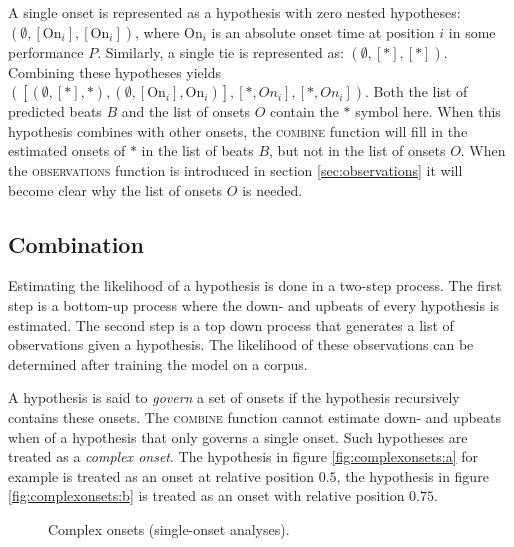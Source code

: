 A single onset is represented as a hypothesis with zero nested hypotheses: $(\emptyset, [\textrm{On}_i], [\textrm{On}_i])$, where $\textrm{On}_i$ is an absolute onset time at position $i$ in some performance $P$. Similarly, a single tie is represented as: $(\emptyset, [*], [*])$. Combining these hypotheses yields $([(\emptyset, [*], *), (\emptyset, [\textrm{On}_i], \textrm{On}_i)], [*, On_i], [*, On_i])$. Both the list of predicted beats $B$ and the list of onsets $O$ contain the $*$ symbol here. When this hypothesis combines with other onsets, the \textsc{combine} function will fill in the estimated onsets of $*$ in the list of beats $B$, but not in the list of onsets $O$. When the \textsc{observations} function is introduced in section \ref{sec:observations} it will become clear why the list of onsets $O$ is needed.

\subsection{Combination}
\label{sec:combination}

Estimating the likelihood of a hypothesis is done in a two-step process. The first step is a bottom-up process where the down- and upbeats of every hypothesis is estimated. The second step is a top down process that generates a list of observations given a hypothesis. The likelihood of these observations can be determined after training the model on a corpus.

A hypothesis is said to \textit{govern} a set of onsets if the hypothesis recursively contains these onsets. The \textsc{combine} function cannot estimate down- and upbeats when of a hypothesis that only governs a single onset. Such hypotheses are treated as a \textit{complex onset}. The hypothesis in figure \ref{fig:complexonsets:a} for example is treated as an onset at relative position $0.5$, the hypothesis in figure \ref{fig:complexonsets:b} is treated as an onset with relative position $0.75$.

\begin{figure}
\centering
{}
\caption{Complex onsets (single-onset analyses).}
\label{fig:singlenotes}
\end{figure}

